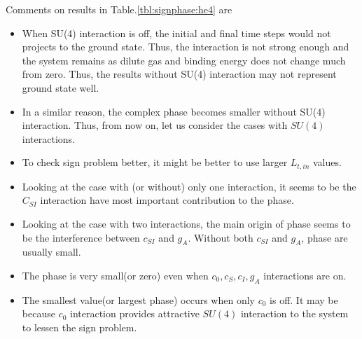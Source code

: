 \documentclass[10pt]{book}
\begin{document}
Comments on results in Table.\ref{tbl:signphase:he4} are
\begin{itemize} 
\item When SU(4) interaction is off, the initial and final time steps 
      would not projects to the ground state. Thus, the interaction is
      not strong enough and the system remains as 
      dilute gas and binding energy does not change much from zero. 
      Thus, the results without SU(4) interaction may not represent ground state well.
      
\item In a similar reason, the complex phase becomes smaller without SU(4) interaction.
      Thus, from now on, let us consider the cases with $SU(4)$ interactions. 
       
\item To check sign problem better, 
      it might be better to use larger $L_{t,in}$ values.

\item Looking at the case with (or without) only one interaction, 
      it seems to be the $C_{SI}$ interaction have most important contribution
      to the phase.
      
\item Looking at the case with two interactions, 
     the main origin of phase seems to be the interference between $c_{SI}$ and $g_{A}$.
     Without both $c_{SI}$ and $g_{A}$, phase are usually small. 
     
\item The phase is very small(or zero) even 
      when $c_0,c_S,c_{I},g_A$ interactions are on. 
          
\item The smallest value(or largest phase) occurs when only $c_0$ is off.  
     It may be because $c_0$ interaction provides 
     attractive $SU(4)$ interaction
     to the system to lessen the sign problem.
\end{itemize} 
\end{document}
